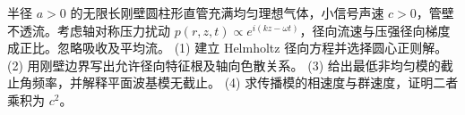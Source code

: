 半径 \(a>0\) 的无限长刚壁圆柱形直管充满均匀理想气体，小信号声速 \(c>0\)，管壁不透流。考虑轴对称压力扰动 \(p(r,z,t)\propto e^{i(kz-\omega t)}\)，径向流速与压强径向梯度成正比。忽略吸收及平均流。
(1) 建立 Helmholtz 径向方程并选择圆心正则解。
(2) 用刚壁边界写出允许径向特征根及轴向色散关系。
(3) 给出最低非均匀模的截止角频率，并解释平面波基模无截止。
(4) 求传播模的相速度与群速度，证明二者乘积为 \(c^2\)。
